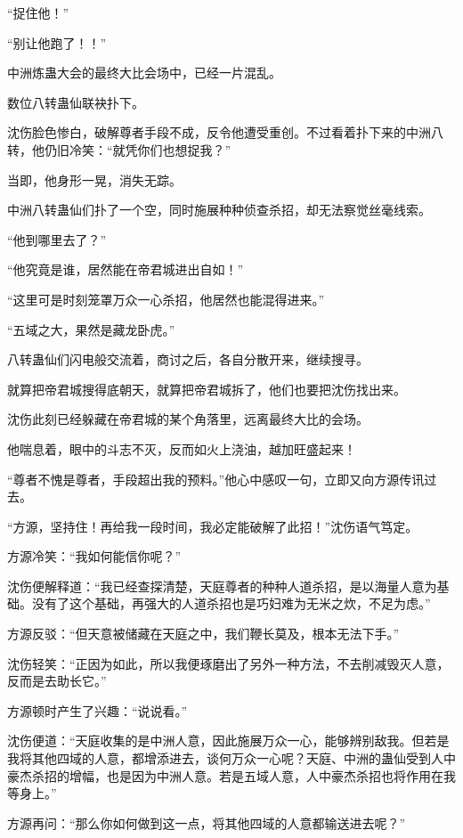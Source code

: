 
\begin{this_body}

“捉住他！”

“别让他跑了！！”

中洲炼蛊大会的最终大比会场中，已经一片混乱。

数位八转蛊仙联袂扑下。

沈伤脸色惨白，破解尊者手段不成，反令他遭受重创。不过看着扑下来的中洲八转，他仍旧冷笑：“就凭你们也想捉我？”

当即，他身形一晃，消失无踪。

中洲八转蛊仙们扑了一个空，同时施展种种侦查杀招，却无法察觉丝毫线索。

“他到哪里去了？”

“他究竟是谁，居然能在帝君城进出自如！”

“这里可是时刻笼罩万众一心杀招，他居然也能混得进来。”

“五域之大，果然是藏龙卧虎。”

八转蛊仙们闪电般交流着，商讨之后，各自分散开来，继续搜寻。

就算把帝君城搜得底朝天，就算把帝君城拆了，他们也要把沈伤找出来。

沈伤此刻已经躲藏在帝君城的某个角落里，远离最终大比的会场。

他喘息着，眼中的斗志不灭，反而如火上浇油，越加旺盛起来！

“尊者不愧是尊者，手段超出我的预料。”他心中感叹一句，立即又向方源传讯过去。

“方源，坚持住！再给我一段时间，我必定能破解了此招！”沈伤语气笃定。

方源冷笑：“我如何能信你呢？”

沈伤便解释道：“我已经查探清楚，天庭尊者的种种人道杀招，是以海量人意为基础。没有了这个基础，再强大的人道杀招也是巧妇难为无米之炊，不足为虑。”

方源反驳：“但天意被储藏在天庭之中，我们鞭长莫及，根本无法下手。”

沈伤轻笑：“正因为如此，所以我便琢磨出了另外一种方法，不去削减毁灭人意，反而是去助长它。”

方源顿时产生了兴趣：“说说看。”

沈伤便道：“天庭收集的是中洲人意，因此施展万众一心，能够辨别敌我。但若是我将其他四域的人意，都增添进去，谈何万众一心呢？天庭、中洲的蛊仙受到人中豪杰杀招的增幅，也是因为中洲人意。若是五域人意，人中豪杰杀招也将作用在我等身上。”

方源再问：“那么你如何做到这一点，将其他四域的人意都输送进去呢？”


\end{this_body}
